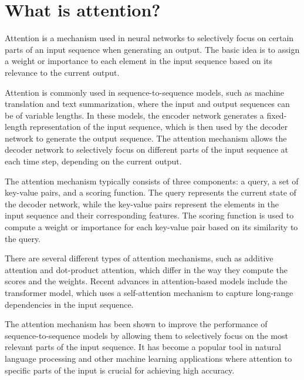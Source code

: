 \section{What is attention?}
Attention is a mechanism used in neural networks to selectively focus on certain parts of an input sequence when generating an output. The basic idea is to assign a weight or importance to each element in the input sequence based on its relevance to the current output.

Attention is commonly used in sequence-to-sequence models, such as machine translation and text summarization, where the input and output sequences can be of variable lengths. In these models, the encoder network generates a fixed-length representation of the input sequence, which is then used by the decoder network to generate the output sequence. The attention mechanism allows the decoder network to selectively focus on different parts of the input sequence at each time step, depending on the current output.

The attention mechanism typically consists of three components: a query, a set of key-value pairs, and a scoring function. The query represents the current state of the decoder network, while the key-value pairs represent the elements in the input sequence and their corresponding features. The scoring function is used to compute a weight or importance for each key-value pair based on its similarity to the query.

There are several different types of attention mechanisms, such as additive attention and dot-product attention, which differ in the way they compute the scores and the weights. Recent advances in attention-based models include the transformer model, which uses a self-attention mechanism to capture long-range dependencies in the input sequence.

The attention mechanism has been shown to improve the performance of sequence-to-sequence models by allowing them to selectively focus on the most relevant parts of the input sequence. It has become a popular tool in natural language processing and other machine learning applications where attention to specific parts of the input is crucial for achieving high accuracy.

